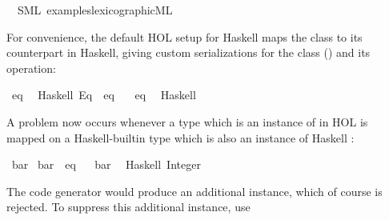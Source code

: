 \begin{isabellebody}
\ \ {\isacharparenleft}SML\ {\isachardoublequoteopen}examples{\isacharslash}lexicographic{\isachardot}ML{\isachardoublequoteclose}{\isacharparenright}%
\begin{isamarkuptext}%
%
\end{isamarkuptext}%
\isamarkuptrue%
%
\isamarkuptrue%
%
\begin{isamarkuptext}%
For convenience, the default
  HOL setup for Haskell maps the  class to
  its counterpart in Haskell, giving custom serializations
  for the class (\isasymCODECLASS) and its operation:%
\end{isamarkuptext}%
\isamarkuptrue%
%
\isadelimML
%
\endisadelimML
%
\isatagML
%
\endisatagML
{\isafoldML}%
%
\isadelimML
%
\endisadelimML
\isanewline
{}\isamarkupfalse%
\ eq\isanewline
\ \ {\isacharparenleft}Haskell\ {\isachardoublequoteopen}Eq{\isachardoublequoteclose}\ \ eq\ {\isasymequiv}\ {\isachardoublequoteopen}{\isacharparenleft}{\isacharequal}{\isacharequal}{\isacharparenright}{\isachardoublequoteclose}{\isacharparenright}\isanewline
\isanewline
{}\isamarkupfalse%
\ eq\isanewline
\ \ {\isacharparenleft}Haskell\ \ {}\ {\isachardoublequoteopen}{\isacharequal}{\isacharequal}{\isachardoublequoteclose}{\isacharparenright}\isanewline
%
\isadelimML
%
\endisadelimML
%
\isatagML
%
\endisatagML
{\isafoldML}%
%
\isadelimML
%
\endisadelimML
%
\begin{isamarkuptext}%
A problem now occurs whenever a type which
  is an instance of  in HOL is mapped
  on a Haskell-builtin type which is also an instance
  of Haskell :%
\end{isamarkuptext}%
\isamarkuptrue%
\isamarkupfalse%
\ bar\isanewline
\isanewline
{}\isamarkupfalse%
\ bar\ {\isacharcolon}{\isacharcolon}\ eq%
\isadelimproof
\ %
\endisadelimproof
%
\isatagproof
\isacommand{{\isachardot}{\isachardot}}\isamarkupfalse%
%
\endisatagproof
{\isafoldproof}%
%
\isadelimproof
%
\endisadelimproof
\isanewline
\isanewline
{}\isamarkupfalse%
\ bar\isanewline
\ \ {\isacharparenleft}Haskell\ {\isachardoublequoteopen}Integer{\isachardoublequoteclose}{\isacharparenright}%
\begin{isamarkuptext}%
The code generator would produce
    an additional instance, which of course is rejected.
    To suppress this additional instance, use

\end{isamarkuptext}
\end{isabellebody}
